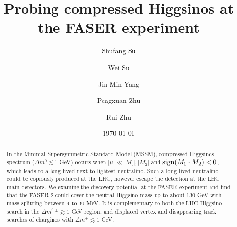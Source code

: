 \documentclass[
    twocolumn,
    superscriptaddress,
    amsmath, 
    amssymb,
    aps,
    reprint,
    floatfix
]{revtex4-2}
\begin{document}

\title{\textbf{Probing compressed Higgsinos at the  FASER experiment } 
}%

\author{Shufang Su}

\author{Wei Su}

\author{Jin Min Yang}

\author{Pengxuan Zhu}

\author{Rui Zhu}

\date{\today}
\begin{abstract}
In the Minimal Supersymmetric Standard Model (MSSM), compressed Higgsinos spectrum ($\Delta m^0 \lesssim 1$ GeV) occurs when $|\mu| \ll |M_1|, |M_2|$ and ${\rm sign}(M_1\cdot M_2)<0$, which leads to a long-lived next-to-lightest neutralino. Such a long-lived neutralino could be copiously produced at the LHC, however escape the detection at the LHC main detectors. We examine the discovery potential at the FASER experiment and find that the FASER 2  could cover the neutral Higgsino mass up to about 130 GeV with mass splitting between 4 to 30 MeV. It is complementary to both the LHC Higgsino search in the $\Delta m^{0,\pm} \gtrsim 1$ GeV region, and displaced vertex and disappearing track searches of charginos with $\Delta m^\pm \lesssim 1$ GeV.
\end{abstract}

\maketitle
\end{document}

